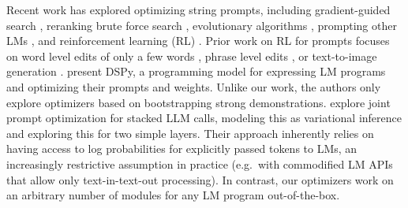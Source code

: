 Recent work has explored optimizing string prompts, 
including gradient-guided search \citep{shin-etal-2020-autoprompt, wen2023hard}, reranking brute force search \citep{gao-etal-2021-making}, evolutionary algorithms \citep{fernando2023promptbreeder}, prompting other LMs \citep{yang2023large, zhou2023large, pryzant2023automatic}, and reinforcement learning (RL) \citep{deng-etal-2022-rlprompt, zhang2022tempera, hao2022optimizing}.  Prior work on RL for prompts focuses on word level edits of only a few words \citep{deng-etal-2022-rlprompt}, phrase level edits \citep{zhang2022tempera}, or text-to-image generation \citep{hao2022optimizing}. 
\citet{khattab2024dspy}  present DSPy, a programming model for expressing LM programs and optimizing their prompts 
and weights. Unlike our work, the authors only explore optimizers based on bootstrapping strong demonstrations. \citet{sordoni2023joint} explore joint prompt optimization for stacked LLM calls, modeling this as variational inference and exploring this for two simple layers. Their approach inherently relies on having access to log probabilities for explicitly passed tokens to LMs, an increasingly restrictive assumption in practice (e.g.\ with commodified LM APIs that allow only text-in-text-out processing). In contrast, our optimizers work on an arbitrary number of modules for any LM program out-of-the-box.
